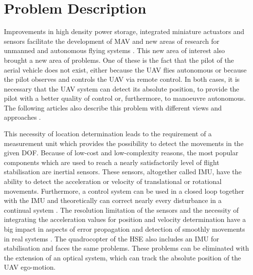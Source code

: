 \section{Problem Description}

Improvements in high density power storage, integrated miniature actuators and
sensors facilitate the development of \gls{MAV} and new areas of research for
unmanned and autonomous flying systems .
 This new area of interest also brought a new area of problems.
 One of these is the fact that the pilot of the aerial vehicle does not exist, either
 because the \gls{UAV} flies autonomous or because the pilot observes and controls the \gls{UAV} via
 remote control. In both cases, it is necessary that the \gls{UAV} system can detect
 its absolute position, to provide the pilot with a better quality of control or,
 furthermore, to manoeuvre autonomous. The following articles also describe this
 problem with different views and approaches 
.

This necessity of location determination leads to the requirement of a measurement unit which
provides the possibility to detect the movements in the given \gls{DOF}. Because of low-cost
and low-complexity reasons, the most popular components which are used to reach
a nearly satisfactorily level of flight stabilisation are inertial sensors.
These sensors, altogether called \gls{IMU}, have the ability to detect the
acceleration or velocity of translational or rotational movements. Furthermore, a control
system can be used in a closed loop together with the \gls{IMU} and theoretically can
 correct nearly every disturbance in a continual system 
.
\newpage
The resolution limitation of the sensors and the necessity of integrating the
acceleration values for position and velocity determination have
a big impact in aspects of error propagation and detection of smoothly movements
in real systems .
The quadrocopter of the \gls{HSE} also includes an \gls{IMU} for stabilisation and faces 
the same problems. These problems can be eliminated with the extension of an optical system,
which can track the absolute position of the \gls{UAV} ego-motion. 


